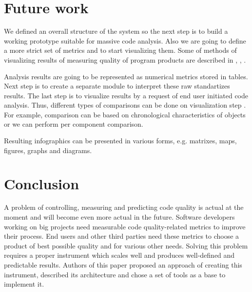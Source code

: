 \section{Future work}

We defined an overall structure of the system so the next step is
to build a working prototype suitable for massive code analysis. Also
we are going to define a more strict set of metrics and to start
visualizing them. Some of methods of visualizing results of measuring
quality of program products are described in \cite{item18}, \cite{item19}, \cite{item20}.

Analysis results are going to be represented as numerical metrics stored in
tables. Next step is to create a separate module to interpret these raw
standartizes results. The last step is to visualize results by a request of
end user initiated code analysis. Thus, different types of comparisons can be
done on visualization step \cite{item17}. For example, comparison can be based
on chronological characteristics of objects or we can perform per component comparison.

Resulting infographics can be presented in various forms, e.g. matrixes, maps,
figures, graphs and diagrams.

\section{Conclusion}

A problem of controlling, measuring and predicting code quality is actual
at the moment and will become even more actual in the future. Software
developers working on big projects need measurable code quality-related
metrics to improve their process. End users and other third parties need
these metrics to choose a product of best possible quality and for various
other needs. Solving this problem requires a proper instrument which scales
well and produces well-defined and predictable results. Authors of this paper
proposed an approach of creating this instrument, described its architecture
and chose a set of tools as a base to implement it.

